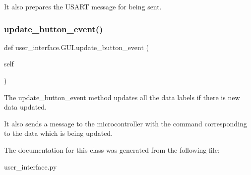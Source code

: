 It also prepares the U\+S\+A\+RT message for being sent. \mbox{\label{classuser__interface_1_1GUI_a866b8e4bf0bc892cc6ae44a68041e006}} 
\subsubsection{\texorpdfstring{update\+\_\+button\+\_\+event()}{update\_button\_event()}}
{\footnotesize\ttfamily def user\+\_\+interface.\+G\+U\+I.\+update\+\_\+button\+\_\+event (\begin{DoxyParamCaption}\item[{}]{self }\end{DoxyParamCaption})}



The update\+\_\+button\+\_\+event method updates all the data labels if there is new data updated. 

It also sends a message to the microcontroller with the command corresponding to the data which is being updated. 

The documentation for this class was generated from the following file\+:\begin{DoxyCompactItemize}
\item 
user\+\_\+interface.\+py\end{DoxyCompactItemize}
